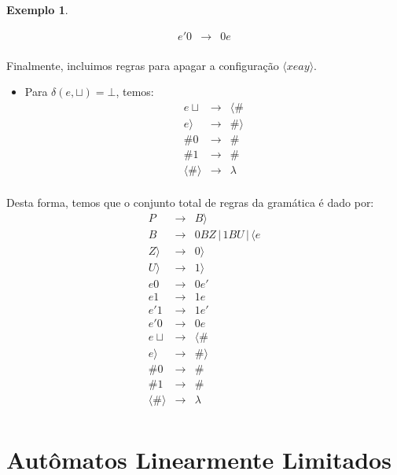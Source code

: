 \documentclass[a4paper]{article}
\theoremstyle{definition}
\newtheorem{Example}{Exemplo}
\begin{document}
\begin{Example}
\begin{itemize}
\[           \begin{array}{lcl}
             e'0 & \to & 0e \\
           \end{array}
         \]    
     \end{itemize}
     Finalmente, incluimos regras para apagar a configuração $\langle x e a y
     \rangle$.
     \begin{itemize}
        \item Para $\delta(e,\sqcup) = \bot$, temos:
          \[
            \begin{array}{lcl}
              e\sqcup & \to & \langle\# \\
              e\rangle & \to & \#\rangle\\
              \#0     & \to & \# \\
              \#1     & \to & \# \\
              \langle \# \rangle & \to & \lambda \\
            \end{array}
          \]
        \end{itemize}
       Desta forma, temos que o conjunto total de regras da gramática é dado
       por:
       \[
         \begin{array}{lcl}
        P & \to & B \rangle \\
        B & \to & 0 B Z \,|\, 1 B U \,|\, \langle e \\
        Z \rangle & \to & 0 \rangle \\
        U \rangle & \to & 1 \rangle \\
             e0 & \to & 0e' \\
           e1 & \to & 1e\\
           e'1 & \to & 1e'\\
           e'0 & \to & 0e \\
              e\sqcup & \to & \langle\# \\
              e\rangle & \to & \#\rangle\\
              \#0     & \to & \# \\
              \#1     & \to & \# \\
              \langle \# \rangle & \to & \lambda \\           
         \end{array}
       \]       
     \end{Example}

     \section{Autômatos Linearmente Limitados}
\end{document}

